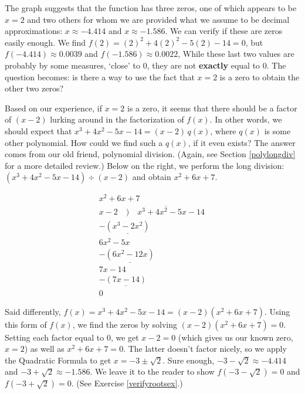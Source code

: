 \documentclass{ximera}
\begin{document}
\begin{center}
\end{center}
 
 
 
 The graph suggests that the function has three zeros, one of which appears to be $x=2$ and two others for whom we are provided what we assume to be decimal approximations:  $x \approx -4.414$ and $x \approx -1.586$.    We can verify if these are zeros easily enough.   We find  $f(2) =(2)^2 + 4(2)^2-5(2)-14 = 0$,  but  $f(-4.414) \approx 0.0039$ and $f(-1.586) \approx 0.0022$,  While these last two values are probably by some measures,  `close' to $0$, they are not \textbf{exactly} equal to $0$.  The question becomes:  is there a way to use the fact that $x=2$ is a zero to obtain the other two zeros?  
 
 Based on our experience, if $x=2$ is a zero, it seems that there should be a factor of $(x-2)$ lurking around in the factorization of $f(x)$.  In other words, we should expect that $x^3 + 4x^2-5x-14=(x-2) \, q(x)$, where $q(x)$ is some other polynomial.  How could we find such a $q(x)$, if it even exists?  The answer comes from our old friend, polynomial division. (Again, see Section \ref{polylongdiv} for a more detailed review.) Below on the right, we perform the long division:  $(x^3 + 4x^2-5x-14) \div (x-2)$ and obtain $x^2+6x+7$.
 






 
  
 
 


\[
\begin{array}{r}
 x^2 + 6x + 7 \\
 x - 2 \quad \overline{)\quad x^3 + 4x^2 - 5x - 14 \,} \\
 -\underline{(x^3 - 2x^2)} \phantom{- 5x - 14} \\
 6x^2 - 5x \phantom{- 14} \\
 -\underline{(6x^2 - 12x)} \phantom{- 14} \\
 7x - 14 \\
 -\underline{(7x - 14)} \\
 0
\end{array}
\]


Said differently, $f(x) = x^3 + 4x^2-5x-14=(x-2)\left(x^2+6x+7\right)$.  Using this form of $f(x)$, we find the zeros by solving $(x-2)\left(x^2+6x+7\right)=0$.  Setting each factor equal to $0$, we get  $x-2=0$ (which gives us our known zero, $x=2$) as well as $x^2+6x+7=0$.   The latter doesn't factor nicely, so we apply the Quadratic Formula to get $x = -3 \pm \sqrt{2}$.  Sure enough, $-3 - \sqrt{2} \approx -4.414$ and $-3 +\sqrt{2} \approx -1.586$.  We leave it to the reader to show $f(-3-\sqrt{2}) = 0$ and $f(-3+\sqrt{2}) = 0$.  (See Exercise \ref{verifyrootsex}.) 
\end{document}
